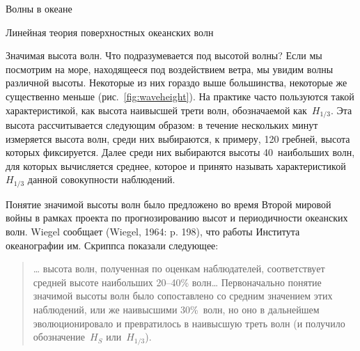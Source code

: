 \begin{chapter}{Волны в океане}
\begin{section}{Линейная теория поверхностных океанских волн}
\begin{paragraph}{Значимая высота волн.}
Что подразумевается под высотой волны? 
Если мы посмотрим на море, находящееся под воздействием ветра, мы увидим
волны различной высоты. Некоторые из них гораздо выше большинства,
некоторые же существенно меньше (рис.~\ref{fig:waveheight}). 
На практике часто пользуются такой характеристикой, как высота наивысшей
трети волн, обозначаемой как~$H_{1/3}$. Эта высота рассчитывается 
следующим образом: в течение нескольких минут измеряется высота волн,
среди них выбираются, к примеру, 120 гребней, высота которых фиксируется.
Далее среди них выбираются высоты 40~наибольших волн, для которых вычисляется
среднее, которое и принято называть характеристикой~$H_{1/3}$ данной 
совокупности наблюдений.
%

Понятие значимой высоты волн было предложено во время Второй мировой войны
в рамках проекта по прогнозированию высот и периодичности океанских волн.
Wiegel сообщает (Wiegel, 1964: p.  198), что работы Института океанографии
им. Скриппса показали следующее:
%
\begin{quote}
\ldots{} высота волн, полученная по оценкам наблюдателей, соответствует 
средней высоте наибольших 20--40\% волн\ldots{} 
Первоначально понятие значимой высоты волн было сопоставлено со средним 
значением этих наблюдений, или же наивысшими 30\%~волн, но оно в дальнейшем
эволюционировало и превратилось в наивысшую треть волн (и получило 
обозначение~$H_S$ или~$H_{1/3}$).
%
\end{quote}


\end{paragraph}
\end{section}
\end{chapter}
